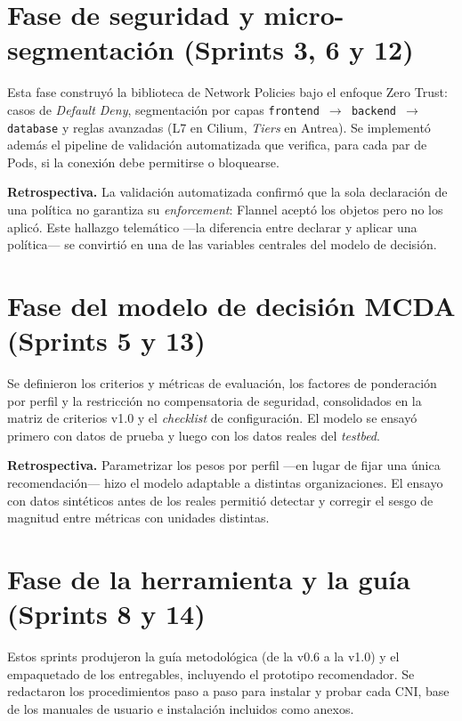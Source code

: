 \section{Fase de seguridad y micro-segmentación (Sprints 3, 6 y 12)}

Esta fase construyó la biblioteca de Network Policies bajo el enfoque Zero Trust: casos de \emph{Default Deny}, segmentación por capas \texttt{frontend $\rightarrow$ backend $\rightarrow$ database} y reglas avanzadas (L7 en Cilium, \emph{Tiers} en Antrea). Se implementó además el pipeline de validación automatizada que verifica, para cada par de Pods, si la conexión debe permitirse o bloquearse.

\textbf{Retrospectiva.} La validación automatizada confirmó que la sola declaración de una política no garantiza su \emph{enforcement}: Flannel aceptó los objetos pero no los aplicó. Este hallazgo telemático ---la diferencia entre declarar y aplicar una política--- se convirtió en una de las variables centrales del modelo de decisión.

\section{Fase del modelo de decisión MCDA (Sprints 5 y 13)}

Se definieron los criterios y métricas de evaluación, los factores de ponderación por perfil y la restricción no compensatoria de seguridad, consolidados en la matriz de criterios v1.0 y el \emph{checklist} de configuración. El modelo se ensayó primero con datos de prueba y luego con los datos reales del \emph{testbed}.

\textbf{Retrospectiva.} Parametrizar los pesos por perfil ---en lugar de fijar una única recomendación--- hizo el modelo adaptable a distintas organizaciones. El ensayo con datos sintéticos antes de los reales permitió detectar y corregir el sesgo de magnitud entre métricas con unidades distintas.

\section{Fase de la herramienta y la guía (Sprints 8 y 14)}

Estos sprints produjeron la guía metodológica (de la v0.6 a la v1.0) y el empaquetado de los entregables, incluyendo el prototipo recomendador. Se redactaron los procedimientos paso a paso para instalar y probar cada CNI, base de los manuales de usuario e instalación incluidos como anexos.


